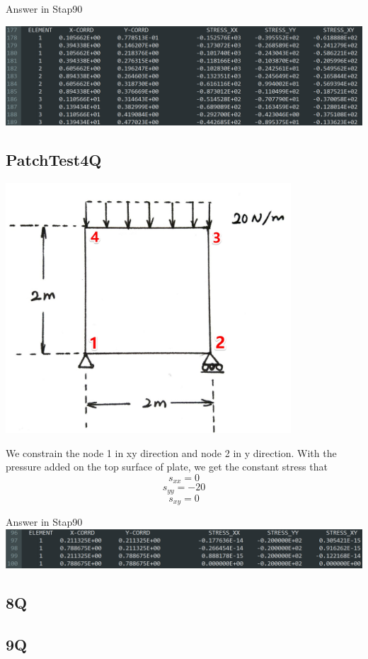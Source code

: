 \documentclass[UTF8]{ctexbook}
\begin{document}
Answer in Stap90

\includegraphics[width=\textwidth]{4Q02.png}

\subsection{PatchTest4Q}
\includegraphics[width=0.8\textwidth]{Patch_4Q.jpg}

We constrain the node 1 in xy direction and node 2 in y direction. With the pressure added on the top surface of plate, we get the constant stress that
$$s_{xx} = 0$$
$$s_{yy} = -20$$
$$s_{xy} = 0$$

Answer in Stap90\\

\includegraphics[width=\textwidth]{4Q03.png}

\subsection{8Q}

\subsection{9Q}
\end{document}
